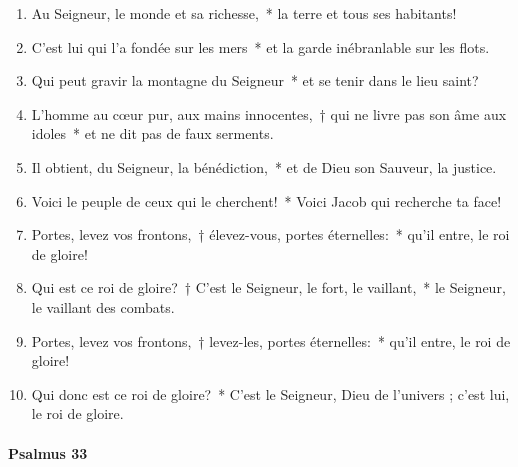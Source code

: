 \documentclass[twoside]{article}
\begin{document}
\begin{paracol}[1]{2}

\begin{enumerate}[wide, itemsep=0mm, labelwidth=!, labelindent=0pt, label=\color{gregoriocolor}\theenumi]
\item Au Seigneur, le monde et sa richesse,~* la terre et tous ses habitants!
\item C'est lui qui l'a fondée sur les mers~* et la garde inébranlable sur les flots.
\item Qui peut gravir la montagne du Seigneur~* et se tenir dans le lieu saint?
\item L'homme au cœur pur, aux mains innocentes,~† qui ne livre pas son âme aux idoles~* et ne dit pas de faux serments.
\item Il obtient, du Seigneur, la bénédiction,~* et de Dieu son Sauveur, la justice.
\item Voici le peuple de ceux qui le cherchent!~* Voici Jacob qui recherche ta face!
\item Portes, levez vos frontons,~† élevez-vous, portes éternelles:~* qu'il entre, le roi de gloire!
\item Qui est ce roi de gloire?~† C'est le Seigneur, le fort, le vaillant,~* le Seigneur, le vaillant des combats.
\item Portes, levez vos frontons,~† levez-les, portes éternelles:~* qu'il entre, le roi de gloire!
\item Qui donc est ce roi de gloire?~* C'est le Seigneur, Dieu de l'univers ; c'est lui, le roi de gloire.
\end{enumerate}

\switchcolumn*

\paragraph{Psalmus 33}



\end{paracol}
\end{document}
